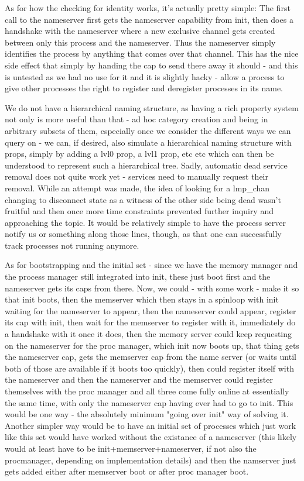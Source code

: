 As for how the checking for identity works, it's actually pretty simple:
The first call to the nameserver first gets the nameserver capability from init, then does a handshake with the nameserver where a new exclusive channel gets created between only this process and the nameserver. Thus the nameserver simply identifies the process by anything that comes over that channel. This has the nice side effect that simply by handing the cap to send there away it should - and this is untested as we had no use for it and it is slightly hacky - allow a process to give other processes the right to register and deregister processes in its name.

\medskip
We do not have a hierarchical naming structure, as having a rich property system not only is more useful than that - ad hoc category creation and being in arbitrary subsets of them, especially once we consider the different ways we can query on - we can, if desired, also simulate a hierarchical naming structure with props, simply by adding a lvl0 prop, a lvl1 prop, etc etc which can then be understood to represent such a hierarchical tree.
Sadly, automatic dead service removal does not quite work yet - services need to manually request their removal. While an attempt was made, the idea of looking for a lmp\_chan changing to disconnect state as a witness of the other side being dead wasn't fruitful and then once more time constraints prevented further inquiry and approaching the topic. It would be relatively simple to have the process server notify us or something along those lines, though, as that one can successfully track processes not running anymore.

\medskip
As for bootstrapping and the initial set - since we have the memory manager and the process manager still integrated into init, these just boot first and the nameserver gets its caps from there. Now, we could - with some work - make it so that init boots, then the memserver which then stays in a spinloop with init waiting for the nameserver to appear, then the nameserver could appear, register its cap with init, then wait for the memserver to register with it, immediately do a handshake with it once it does, then the memory server could keep requesting on the nameserver for the proc manager, which init now boots up, that thing gets the nameserver cap, gets the memserver cap from the name server (or waits until both of those are available if it boots too quickly), then could register itself with the nameserver and then the nameserver and the memserver could register themselves with the proc manager and all three come fully online at essentially the same time, with only the nameserver cap having ever had to go to init. This would be one way - the absolutely minimum "going over init" way of solving it.
Another simpler way would be to have an initial set of processes which just work like this set would have worked without the existance of a nameserver (this likely would at least have to be init+memserver+nameserver, if not also the procmanager, depending on implementation details) and then the namserver just gets added either after memserver boot or after proc manager boot.

